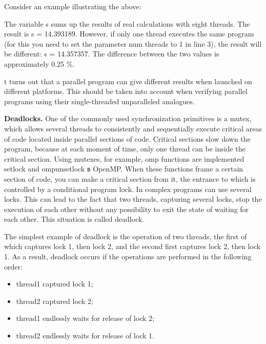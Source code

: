 {	\par Consider an example illustrating the above:
	\begin{figure}[H]
		
	\end{figure}
	\par The variable s sums up the results of real calculations with eight threads. The result is s = 14.393189. However, if only one thread executes the same program (for this you need to set the parameter num \textunderscore threads to 1 in line 3), the result will be different: s = 14.357357. The difference between the two values is approximately 0.25 \%.
	\par t turns out that a parallel program can give different results when launched on different platforms. This should be taken into account when verifying parallel programs using their single-threaded unparalleled analogues.
	\par\textbf{Deadlocks.} One of the commonly used synchronization primitives is a mutex, which allows several threads to consistently and sequentially execute critical areas of code located inside parallel sections of code. Critical sections slow down the program, because at each moment of time, only one thread can be inside the critical section. Using mutexes, for example, omp functions are implemented \textunderscore set\textunderscore lock and omp\textunderscore unset\textunderscore lock в OpenMP. When these functions frame a certain section of code, you can make a critical section from it, the entrance to which is controlled by a conditional program lock. In complex programs can use several locks. This can lead to the fact that two threads, capturing several locks, stop the execution of each other without any possibility to exit the state of waiting for each other. This situation is called deadlock.
	\par The simplest example of deadlock is the operation of two threads, the first of which captures lock 1, then lock 2, and the second first captures lock 2, then lock 1. As a result, deadlock occurs if the operations are performed in the following order:
	\begin{itemize}
\item thread1 captured lock 1;
\item thread2 captured lock 2;
\item thread1 endlessly waits for release of lock 2;
\item thread2 endlessly waits for release of lock 1.
	\end{itemize}
}
